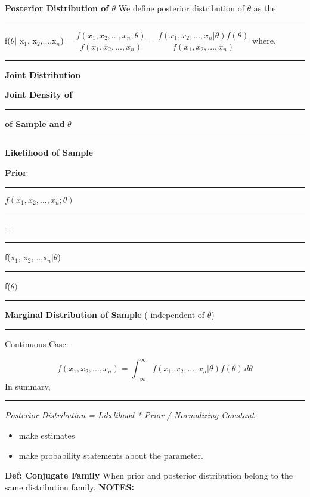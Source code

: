 \documentclass[]{article}
\begin{document}
\newpage
\Large\textbf{Posterior Distribution of $\theta$}
\newline
We define posterior distribution of $\theta$ as the 
\newline
\newline\Large\rule{2.2cm}{0pt}   f($\theta |$ x$_1$, x$_2$,...,x$_n$) = $\dfrac{f(x_1, x_2,...,x_n ; \theta)}{ f(x_1, x_2,...,x_n)} = \dfrac{f(x_1, x_2,...,x_n | \theta)f(\theta)}{ f(x_1, x_2,...,x_n)}$
\newline
\newline where,
\newline
\newline  \Large\rule{2cm}{0pt}  \textbf{Joint Distribution } \Large\rule{0cm}{0pt} \textbf{Joint Density of } 
\newline  \Large\rule{2cm}{0pt}  \textbf{of Sample and} $\theta$ \Large\rule{.65cm}{0pt} \textbf{Likelihood of Sample} \Large\rule{0cm}{0pt} \textbf{Prior}
\newline\Large\rule{2cm}{0pt} $f(x_1, x_2,...,x_n ; \theta)$     \Large\rule{.3cm}{0pt} =   \Large\rule{.5cm}{0pt}  f(x$_1$, x$_2$,...,x$_n | \theta$)  \Large\rule{1.5cm}{0pt}   f($\theta)$ 
\newline
\newline \Large\rule{2cm}{0pt}  \textbf{Marginal Distribution of Sample} ( independent of $\theta$)
\newline  \Large\rule{2cm}{0pt}  Continuous Case:
\Large\rule{0cm}{0pt}  \[f(x_1, x_2,...,x_n ) =  \int_{-\infty}^{\infty}  f(x_1, x_2,...,x_n | \theta)f(\theta)  \,d\theta \]
In summary,
\newline \Large\rule{2.5cm}{0pt} \textit{Posterior Distribution = Likelihood * Prior / Normalizing Constant}
\newline
\newline {}
\begin{itemize}
	\item make estimates
	\item make probability statements about the parameter.
\end{itemize}
\Large\textbf{Def: Conjugate Family}
\newline When prior and posterior distribution belong to the same distribution family. 
\newline
\newline
\Large\textbf{NOTES:}
\end{document}
